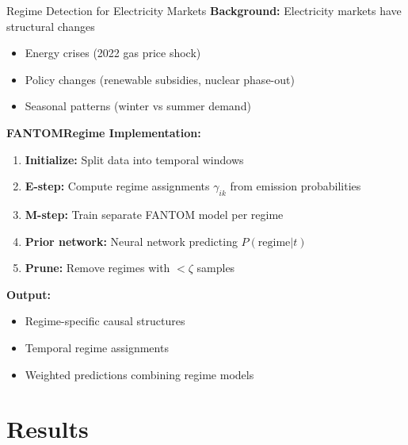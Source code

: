 \documentclass[aspectratio=169]{beamer}
\begin{document}
\begin{frame}{Regime Detection for Electricity Markets}
\textbf{Background:} Electricity markets have structural changes
\begin{itemize}
    \item Energy crises (2022 gas price shock)
    \item Policy changes (renewable subsidies, nuclear phase-out)
    \item Seasonal patterns (winter vs summer demand)
\end{itemize}

\vspace{0.3cm}
\textbf{FANTOMRegime Implementation:}
\begin{enumerate}
    \item \textbf{Initialize:} Split data into temporal windows
    \item \textbf{E-step:} Compute regime assignments $\gamma_{ik}$ from emission probabilities
    \item \textbf{M-step:} Train separate FANTOM model per regime
    \item \textbf{Prior network:} Neural network predicting $P(\text{regime} | t)$
    \item \textbf{Prune:} Remove regimes with $< \zeta$ samples
\end{enumerate}

\vspace{0.3cm}
\textbf{Output:}
\begin{itemize}
    \item Regime-specific causal structures
    \item Temporal regime assignments
    \item Weighted predictions combining regime models
\end{itemize}
\end{frame}

\section{Results}
\end{document}
